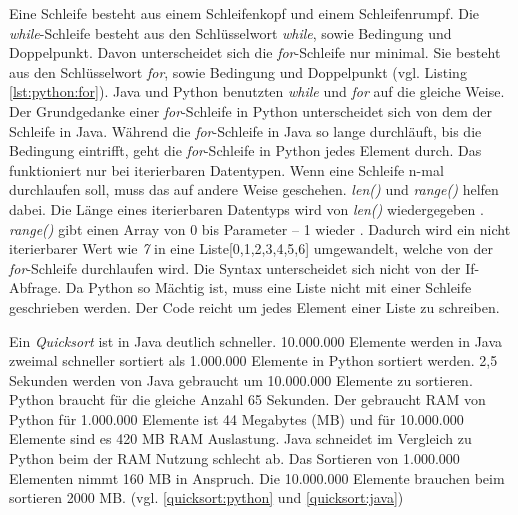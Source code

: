 Eine Schleife besteht aus einem Schleifenkopf und einem Schleifenrumpf.
Die \textit{while}-Schleife besteht aus den Schlüsselwort \textit{while}, sowie Bedingung und Doppelpunkt.
Davon unterscheidet sich die \textit{for}-Schleife nur minimal. 
Sie besteht aus den Schlüsselwort \textit{for}, sowie Bedingung und Doppelpunkt (vgl. Listing \ref{lst:python:for}). 
Java und Python benutzten \textit{while} und \textit{for} auf die gleiche Weise. 
Der Grundgedanke einer \textit{for}-Schleife in Python unterscheidet sich von dem der Schleife in Java. 
Während die \textit{for}-Schleife in Java so lange durchläuft, bis die Bedingung eintrifft, geht die \textit{for}-Schleife in Python jedes Element durch. 
Das funktioniert nur bei iterierbaren Datentypen. 
Wenn eine Schleife n-mal durchlaufen soll, muss das auf andere Weise geschehen.
\textit{len()} und \textit{range()} helfen dabei. 
Die Länge eines iterierbaren Datentyps wird von \textit{len()} wiedergegeben \cite{w3school_len}. 
\textit{range()} gibt einen Array von 0 bis Parameter – 1 wieder \cite{w3school_range}. 
Dadurch wird ein nicht iterierbarer Wert wie \textit{7} in eine Liste[0,1,2,3,4,5,6] umgewandelt, welche von der \textit{for}-Schleife durchlaufen wird.
Die Syntax unterscheidet sich nicht von der If-Abfrage. 
Da Python so Mächtig ist, muss eine Liste nicht mit einer Schleife geschrieben werden. 
Der Code  reicht um jedes Element einer Liste zu schreiben.\cite{Python3:Buch}\cite{Louis:2010}
\par
Ein \textit{Quicksort} ist in Java deutlich schneller. 10.000.000 Elemente werden in Java zweimal schneller sortiert als 1.000.000 Elemente in Python sortiert werden. 2,5 Sekunden werden von Java gebraucht um 10.000.000 Elemente zu sortieren. Python braucht für die gleiche Anzahl 65 Sekunden. Der gebraucht RAM von Python für 1.000.000 Elemente ist 44 Megabytes (MB) und für 10.000.000 Elemente sind es 420 MB RAM Auslastung. Java schneidet im Vergleich zu Python beim der RAM Nutzung schlecht ab. Das Sortieren von 1.000.000 Elementen nimmt 160 MB in Anspruch. Die 10.000.000 Elemente brauchen beim sortieren 2000 MB. (vgl. \ref{quicksort:python} und \ref{quicksort:java})
